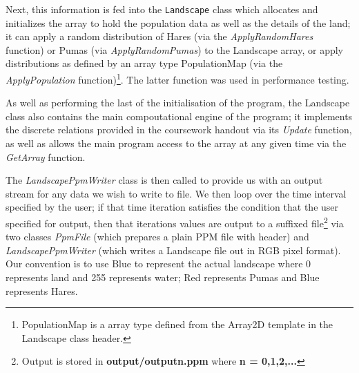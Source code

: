 Next, this information is fed into the \texttt{Landscape} class which allocates and initializes the array to hold the population data as well as the details of the land; it can apply a random distribution of Hares (via the \textit{ApplyRandomHares} function) or Pumas (via \textit{ApplyRandomPumas}) to the Landscape array, or apply distributions as defined by an array type PopulationMap (via the \textit{ApplyPopulation} function)\footnote{PopulationMap is a array type defined from the Array2D template in the Landscape class header.}. The latter function was used in performance testing.

As well as performing the last of the initialisation of the program, the Landscape class also contains the main compoutational engine of the program; it implements the discrete relations provided in the coursework handout via its \textit{Update} function, as well as allows the main program access to the array at any given time via the \textit{GetArray} function.

The \textit{LandscapePpmWriter} class is then called to provide us with an output stream for any data we wish to write to file. We then loop over the time interval specified by the user; if that time iteration satisfies the condition that the user specified for output, then that iterations values are output to a suffixed file\footnote{Output is stored in \textbf{output/outputn.ppm} where \textbf{n = 0,1,2,...}} via two classes \textit{PpmFile} (which prepares a plain PPM file with header) and \textit{LandscapePpmWriter} (which writes a Landscape file out in RGB pixel format). Our convention is to use Blue to represent the actual landscape where 0 represents land and 255 represents water; Red represents Pumas and Blue represents Hares.

